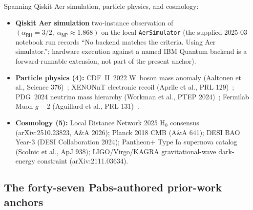 \documentclass[11pt,a4paper]{amsart}
\theoremstyle{plain}
\theoremstyle{definition}
\begin{document}
Spanning Qiskit Aer simulation, particle physics, and cosmology:
\begin{itemize}[itemsep=2pt]
\item \textbf{Qiskit Aer simulation} two-instance observation of $(\alpha_{\textsf{RH}}=3/2,\;\alpha_{\textsf{NP}}\approx 1.868)$ on the local \texttt{AerSimulator} (the supplied 2025-03 notebook run records ``No backend matches the criteria. Using Aer simulator.''; hardware execution against a named IBM Quantum backend is a forward-runnable extension, not part of the present anchor).
\item \textbf{Particle physics (4):} CDF~II~2022 W~boson mass anomaly (Aaltonen et al., Science 376)~\cite{cdf2022wboson}; XENONnT electronic recoil (Aprile et al., PRL 129)~\cite{xenon-collab}; PDG~2024 neutrino mass hierarchy (Workman et al., PTEP 2024)~\cite{pdg2024}; Fermilab Muon $g-2$ (Aguillard et al., PRL 131)~\cite{fermilab-muon-g-2}.
\item \textbf{Cosmology (5):} Local Distance Network 2025 H$_0$ consensus (arXiv:2510.23823, A\&A 2026); Planck 2018 CMB (A\&A 641); DESI BAO Year-3 (DESI Collaboration 2024); Pantheon$+$ Type Ia supernova catalog (Scolnic et al., ApJ 938); LIGO/Virgo/KAGRA gravitational-wave dark-energy constraint (arXiv:2111.03634).
\end{itemize}

\subsection{The forty-seven Pabs-authored prior-work anchors}
\end{document}
